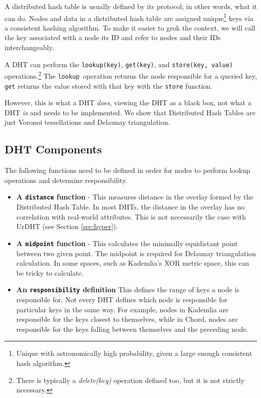 \documentclass[11pt,conference]{IEEEtran}
\begin{document}
A distributed hash table is usually defined by its protocol; in other words, what it can do.
Nodes and data in a distributed hash table are assigned unique\footnote{Unique with astronomically high probability, given a large enough consistent hash algorithm.} keys via a consistent hashing algorithm.
To make it easier to grok the context, we will call the key associated with a node its ID and refer to  nodes and their IDs interchangeably.

A DHT can perform the \texttt{lookup(key)}, \texttt{get(key)}, and \texttt{store(key, value)} operations.\footnote{There is typically a \textit{delete(key)} operation defined too, but it is not strictly necessary.}
The \texttt{lookup }operation returns the node responsible for a queried key, \texttt{get} returns the value stored with that key with the \texttt{store} function.

However, this is what a DHT \textit{does}, viewing the DHT as a black box, not what a DHT \textit{is} and needs to be implemented.
We show that Distributed Hash Tables are just Voronoi tessellations and Delaunay triangulation.


\subsection{DHT Components}
The following functions need to be defined in order for nodes to perform lookup operations and determine responsibility.

\begin{itemize}
	\item \textbf{A \texttt{distance} function } - 
	This measures distance in the overlay formed by the Distributed Hash Table.
	In most DHTs, the distance in the overlay has no correlation with real-world attributes.
	This is not necessarily the case with UrDHT (see Section \ref{sec:hyper}).
	
	\item \textbf{A \texttt{midpoint} function} - This calculates the minimally equidistant point between two given point.
	The midpoint is required for Delaunay triangulation calculation.
	In some spaces, such as Kademlia's XOR metric space, this can be tricky to calculate.  %
	\item \textbf{An \texttt{responsibility} definition}  This defines the range of keys a node is responsible for. 
	Not every DHT defines which node is responsible for particular keys in the same way. 
	For example, nodes in Kademlia are responsible for the keys closest to themselves, while in Chord, nodes are responsible for the keys falling between themselves and the preceding node.
\end{itemize}
\end{document}
